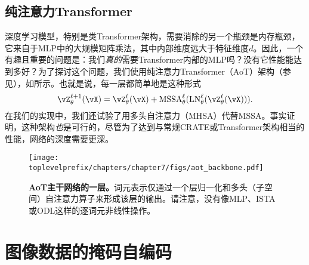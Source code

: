 \documentclass[../../book-main_zh.tex]{subfiles}
\begin{document}
\subsection{纯注意力Transformer} \label{sub:aot_experiments}

深度学习模型，特别是类Transformer架构，需要消除的另一个瓶颈是内存瓶颈，它来自于MLP中的大规模矩阵乘法，其中内部维度远大于特征维度\(d\)。因此，一个有趣且重要的问题是：我们\textit{真的}需要Transformer内部的MLP吗？没有它性能能达到多好？为了探讨这个问题，我们使用纯注意力Transformer（AoT）架构（参见），如所示。也就是说，每一层都简单地是这种形式
\begin{equation}
    \vZ_{\theta}^{\ell + 1}(\vX) = \vZ_{\theta}^{\ell}(\vX) + \MSSA_{\theta}^{\ell}(\LN_{\theta}^{\ell}(\vZ_{\theta}^{\ell}(\vX))).
\end{equation}
在我们的实现中，我们还试验了用多头自注意力（MHSA）代替MSSA。事实证明，这种架构\textit{也}是可行的，尽管为了达到与常规CRATE或Transformer架构相当的性能，网络的深度需要更深。%


\begin{figure}
    \centering 
    \texttt{[image: \\toplevelprefix/chapters/chapter7/figs/aot\_backbone.pdf]}
    \caption{\small\textbf{AoT主干网络的一层。}词元表示仅通过一个层归一化和多头（子空间）自注意力算子来形成该层的输出。请注意，没有像MLP、ISTA或ODL这样的逐词元非线性操作。}
    \label{fig:aot_backbone}
\end{figure}


 

\section{图像数据的掩码自编码}\label{sec:image_completion}
\end{document}
